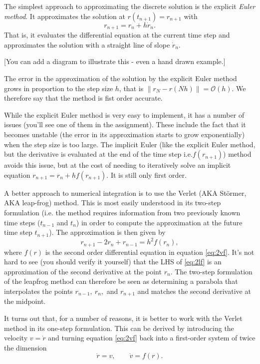 \documentclass{article}
\begin{document}
The simplest approach to approximating the discrete solution is the explicit \emph{Euler method}. It approximates the solution at $r(t_{n+1})=r_{n+1}$ with
$$
	r_{n+1} = r_n + h \dot{r}_n.
$$
That is, it evaluates the differential equation at the current time step and approximates the solution with a straight line of slope $\dot{r}_n$. 

[You can add a diagram to illustrate this - even a hand drawn example.]

The error in the approximation of the solution by the explicit Euler method grows in proportion to the step size $h$, that is $\|r_N-r(Nh)\|=\mathcal{O}(h)$. We therefore say that the method is fist order accurate.

While the explicit Euler method is very easy to implement, it has a number of issues (you'll see one of them in the assignment). These include the fact that it becomes unstable (the error in its approximation starts to grow exponentially) when the step size is too large. The implicit Euler (like the explicit Euler method, but the derivative is evaluated at the end of the time step i.e.$f(r_{n+1})$) method avoids this issue, but at the cost of needing to iteratively solve an implicit equation $r_{n+1}=r_n+hf(r_{n+1})$. It is still only first order.

A better approach to numerical integration is to use the Verlet (AKA St\"{o}rmer, AKA leap-frog) method. This is most easily understood in its two-step formulation (i.e. the method requires information from two previously known time steps ($t_{n-1}$ and $t_n$) in order to compute the approximation at the future time step $t_{n+1}$). The approximation is then given by 
\begin{equation}
	r_{n+1} - 2r_n + r_{n-1} = h^2f(r_n),
	\label{eq:2lf}
\end{equation}
where $f(r)$ is the second order differential equation in equation \ref{eq:2vf}. It's not hard to see (you should verify it yourself) that the LHS of \ref{eq:2lf} is an approximation of the second derivative at the point $r_n$.
The two-step formulation of the leapfrog method can therefore be seen as determining a parabola that interpolates the points $r_{n-1},~r_{n},$ and $r_{n+1}$ and matches the second derivative at the midpoint.

It turns out that, for a number of reasons, it is better to work with the Verlet method in its one-step formulation. This can be derived by introducing the velocity $v=\dot{r}$ and turning equation \ref{eq:2vf} back into a first-order system of twice the dimension
$$
	\dot{r} = v,\qquad \dot{v} = f(r).
$$
\end{document}
